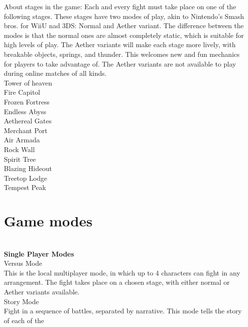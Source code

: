 \documentclass[11pt]{article}
\begin{document}
About stages in the game: Each and every fight must take place on one of the following stages. These stages have two modes of play, akin to Nintendo's Smash bros. for WiiU nad 3DS: Normal and Aether variant. The difference between the modes is that the normal ones are almost completely static, which is suitable for high levels of play. The Aether variants will make each stage more lively, with breakable objects, springs, and thunder. This welcomes new and fun mechanics for players to take advantage of. The Aether variants are not available to play during online matches of all kinds.\\

Tower of heaven\\
Fire Capitol\\
Frozen Fortress\\
Endless Abyss\\
Aethereal Gates\\
Merchant Port\\
Air Armada\\
Rock Wall\\
Spirit Tree\\
Blazing Hideout\\
Treetop Lodge\\
Tempest Peak\\


\chapter{Game modes}\\


\textbf{Single Player Modes}\\ %

Versus Mode\\
This is the local multiplayer mode, in which up to 4 characters can fight in any arrangement. The fight takes place on a chosen stage, with either normal or Aether variants available.
\\

Story Mode\\
Fight in a sequence of battles, separated by narrative. This mode tells the story of each of the 
\\
\end{document}
